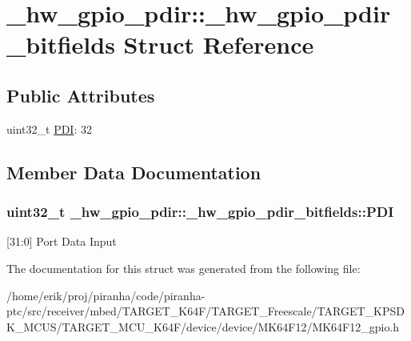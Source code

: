 \hypertarget{struct__hw__gpio__pdir_1_1__hw__gpio__pdir__bitfields}{}\section{\+\_\+hw\+\_\+gpio\+\_\+pdir\+:\+:\+\_\+hw\+\_\+gpio\+\_\+pdir\+\_\+bitfields Struct Reference}
\label{struct__hw__gpio__pdir_1_1__hw__gpio__pdir__bitfields}
\subsection*{Public Attributes}
\begin{DoxyCompactItemize}
\item 
uint32\+\_\+t \hyperlink{struct__hw__gpio__pdir_1_1__hw__gpio__pdir__bitfields_aedb4210e9e5faa9adad03b2b356153ff}{P\+DI}\+: 32
\end{DoxyCompactItemize}


\subsection{Member Data Documentation}
\subsubsection[{\texorpdfstring{P\+DI}{PDI}}]{\setlength{\rightskip}{0pt plus 5cm}uint32\+\_\+t \+\_\+hw\+\_\+gpio\+\_\+pdir\+::\+\_\+hw\+\_\+gpio\+\_\+pdir\+\_\+bitfields\+::\+P\+DI}\hypertarget{struct__hw__gpio__pdir_1_1__hw__gpio__pdir__bitfields_aedb4210e9e5faa9adad03b2b356153ff}{}\label{struct__hw__gpio__pdir_1_1__hw__gpio__pdir__bitfields_aedb4210e9e5faa9adad03b2b356153ff}
\mbox{[}31\+:0\mbox{]} Port Data Input 

The documentation for this struct was generated from the following file\+:\begin{DoxyCompactItemize}
\item 
/home/erik/proj/piranha/code/piranha-\/ptc/src/receiver/mbed/\+T\+A\+R\+G\+E\+T\+\_\+\+K64\+F/\+T\+A\+R\+G\+E\+T\+\_\+\+Freescale/\+T\+A\+R\+G\+E\+T\+\_\+\+K\+P\+S\+D\+K\+\_\+\+M\+C\+U\+S/\+T\+A\+R\+G\+E\+T\+\_\+\+M\+C\+U\+\_\+\+K64\+F/device/device/\+M\+K64\+F12/M\+K64\+F12\+\_\+gpio.\+h\end{DoxyCompactItemize}
